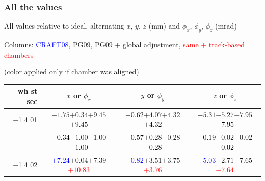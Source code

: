 \documentclass[compress]{beamer}
\begin{document}
\begin{frame}
\frametitle{All the values}
\tiny

All values relative to ideal, alternating $x$, $y$, $z$ (mm) and $\phi_x$, $\phi_y$, $\phi_z$ (mrad)

Columns: \textcolor{blue}{CRAFT08}, PG09, PG09 $+$ global adjustment, \textcolor{red}{same $+$ track-based chambers}

\hfill (color applied only if chamber was aligned)

\vfill
\renewcommand{\arraystretch}{1.1}
\begin{tabular}{r | c | c | c}
wh st sec & $x$ or $\phi_x$ & $y$ or $\phi_y$ & $z$ or $\phi_z$ \\\hline
$-$1 4 01 & \textcolor{black}{$-1.75$}\hspace{0.1 cm}$+0.34$\hspace{0.1 cm}$+9.45$\hspace{0.1 cm}\textcolor{black}{$+9.45$} & \textcolor{black}{$+0.62$}\hspace{0.1 cm}$+4.07$\hspace{0.1 cm}$+4.32$\hspace{0.1 cm}\textcolor{black}{$+4.32$} & \textcolor{black}{$-5.31$}\hspace{0.1 cm}$-5.27$\hspace{0.1 cm}$-7.95$\hspace{0.1 cm}\textcolor{black}{$-7.95$} \\
          & \textcolor{black}{$-0.34$}\hspace{0.1 cm}$-1.00$\hspace{0.1 cm}$-1.00$\hspace{0.1 cm}\textcolor{black}{$-1.00$} & \textcolor{black}{$+0.57$}\hspace{0.1 cm}$+0.28$\hspace{0.1 cm}$-0.28$\hspace{0.1 cm}\textcolor{black}{$-0.28$} & \textcolor{black}{$-0.19$}\hspace{0.1 cm}$-0.02$\hspace{0.1 cm}$-0.02$\hspace{0.1 cm}\textcolor{black}{$-0.02$} \\
$-$1 4 02 & \textcolor{blue}{$+7.24$}\hspace{0.1 cm}$+0.04$\hspace{0.1 cm}$+7.39$\hspace{0.1 cm}\textcolor{red}{$+10.83$} & \textcolor{blue}{$-0.82$}\hspace{0.1 cm}$+3.51$\hspace{0.1 cm}$+3.75$\hspace{0.1 cm}\textcolor{red}{$+3.76$} & \textcolor{blue}{$-5.03$}\hspace{0.1 cm}$-2.71$\hspace{0.1 cm}$-7.65$\hspace{0.1 cm}\textcolor{red}{$-7.64$} \\

\end{tabular}
\end{frame}
\end{document}
